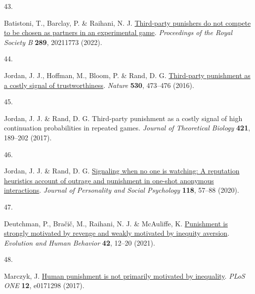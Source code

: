 \documentclass[
  man,floatsintext]{apa6}
\newlength{\cslhangindent}
\newlength{\csllabelwidth}
\newlength{\cslentryspacingunit} %
\newenvironment{CSLReferences}[2] %
 {%
  \setlength{\parindent}{0pt}
  \ifodd #1
  \let\oldpar\par
  \def\par{\hangindent=\cslhangindent\oldpar}
  \fi
  \setlength{\parskip}{#2\cslentryspacingunit}
 }%
 {}
\newcommand{\CSLLeftMargin}[1]{\parbox[t]{\csllabelwidth}{#1}}
\newcommand{\CSLRightInline}[1]{\parbox[t]{\linewidth - \csllabelwidth}{#1}\break}
\begin{document}
\begin{CSLReferences}{0}{0}
\leavevmode{}%
\CSLLeftMargin{43. }%
\CSLRightInline{Batistoni, T., Barclay, P. \& Raihani, N. J. \href{https://doi.org/10.1098/rspb.2021.1773}{Third-party punishers do not compete to be chosen as partners in an experimental game}. \emph{Proceedings of the Royal Society B} \textbf{289}, 20211773 (2022).}

\leavevmode{}%
\CSLLeftMargin{44. }%
\CSLRightInline{Jordan, J. J., Hoffman, M., Bloom, P. \& Rand, D. G. \href{https://doi.org/10.1038/nature16981}{Third-party punishment as a costly signal of trustworthiness}. \emph{Nature} \textbf{530}, 473--476 (2016).}

\leavevmode{}%
\CSLLeftMargin{45. }%
\CSLRightInline{Jordan, J. J. \& Rand, D. G. Third-party punishment as a costly signal of high continuation probabilities in repeated games. \emph{Journal of Theoretical Biology} \textbf{421}, 189--202 (2017).}

\leavevmode{}%
\CSLLeftMargin{46. }%
\CSLRightInline{Jordan, J. J. \& Rand, D. G. \href{https://doi.org/10.1037/pspi0000186}{Signaling when no one is watching: A reputation heuristics account of outrage and punishment in one-shot anonymous interactions}. \emph{Journal of Personality and Social Psychology} \textbf{118}, 57--88 (2020).}

\leavevmode{}%
\CSLLeftMargin{47. }%
\CSLRightInline{Deutchman, P., Bračič, M., Raihani, N. J. \& McAuliffe, K. \href{https://doi.org/10.1016/j.evolhumbehav.2020.06.001}{Punishment is strongly motivated by revenge and weakly motivated by inequity aversion}. \emph{Evolution and Human Behavior} \textbf{42}, 12--20 (2021).}

\leavevmode{}%
\CSLLeftMargin{48. }%
\CSLRightInline{Marczyk, J. \href{https://doi.org/10.1371/journal.pone.0171298}{Human punishment is not primarily motivated by inequality}. \emph{PLoS ONE} \textbf{12}, e0171298 (2017).}

\end{CSLReferences}

\endgroup

\newpage
\vspace*{60mm}

\renewcommand{\figurename}{Supplementary Figure}
\renewcommand{\tablename}{Supplementary Table}
\renewcommand{\thefigure}{\arabic{figure}} \setcounter{figure}{0}
\renewcommand{\thetable}{\arabic{table}} \setcounter{table}{0}
\renewcommand{\theequation}{S\arabic{equation}} \setcounter{equation}{0}
\end{document}
